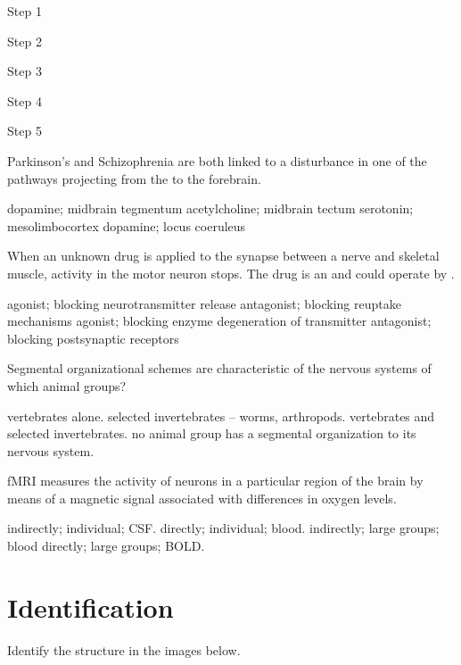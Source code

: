 \documentclass[]{exam}
\begin{document}
\begin{questions}
\question  Step 1

\question  Step 2

\question  Step 3

\question  Step 4

\question  Step 5	

\newpage
\question  Parkinson’s and Schizophrenia are both linked to a disturbance in one of the \fillin pathways projecting from the \fillin to the forebrain.   
\begin{choices}
\choice  dopamine; midbrain tegmentum
\choice  acetylcholine; midbrain tectum
\choice  serotonin; mesolimbocortex
\choice  dopamine; locus coeruleus
\end{choices}

\question  When an unknown drug is applied to the synapse between a nerve and skeletal muscle, activity in the motor neuron stops.  The drug is an \fillin and could operate by \fillin.
\begin{choices}
\choice  agonist; blocking neurotransmitter release
\choice  antagonist; blocking reuptake mechanisms
\choice  agonist; blocking enzyme degeneration of transmitter
\choice  antagonist; blocking postsynaptic receptors
\end{choices}

\question  Segmental organizational schemes are characteristic of the nervous systems of which animal groups?
\begin{choices}
\choice  vertebrates alone.
\choice  selected invertebrates -- worms, arthropods.
\choice  vertebrates and selected invertebrates.
\choice  no animal group has a segmental organization to its nervous system.
\end{choices}

\question  fMRI \fillin measures the activity of \fillin neurons in a particular region of the brain by means of a magnetic signal associated with differences in \fillin oxygen levels.
\begin{choices}
\choice  indirectly; individual; CSF.
\choice  directly; individual; blood.
\choice  indirectly; large groups; blood
\choice  directly; large groups; BOLD.
\end{choices}

\newpage
\section{Identification}

\question Identify the structure in the images below.


\end{questions}
\end{document}

